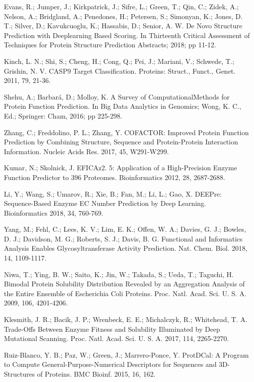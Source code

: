 \documentclass[12pt]{article}
\begin{document}
\begin{thebibliography}{99}
 Evans, R.; Jumper, J.; Kirkpatrick, J.; Sifre, L.; Green, T.; Qin, C.; Zidek, A.; Nelson, A.; Bridgland, A.; Penedones, H.; Petersen, S.; Simonyan, K.; Jones, D. T.; Silver, D.; Kavukcuoglu, K.; Hassabis, D.; Senior, A. W. De Novo Structure Prediction with Deeplearning Based Scoring. In Thirteenth Critical Assessment of Techniques for Protein Structure Prediction Abstracts; 2018; pp 11-12.

 Kinch, L. N.; Shi, S.; Cheng, H.; Cong, Q.; Pei, J.; Mariani, V.; Schwede, T.; Grishin, N. V. CASP9 Target Classification. Proteins: Struct., Funct., Genet. 2011, 79, 21-36.

 Shehu, A.; Barbará, D.; Molloy, K. A Survey of ComputationalMethods for Protein Function Prediction. In Big Data Analytics in Genomics; Wong, K. C., Ed.; Springer: Cham, 2016; pp 225-298.

 Zhang, C.; Freddolino, P. L.; Zhang, Y. COFACTOR: Improved Protein Function Prediction by Combining Structure, Sequence and Protein-Protein Interaction Information. Nucleic Acids Res. 2017, 45, W291-W299.

 Kumar, N.; Skolnick, J. EFICAz2. 5: Application of a High-Precision Enzyme Function Predictor to 396 Proteomes. Bioinformatics 2012, 28, 2687-2688.

 Li, Y.; Wang, S.; Umarov, R.; Xie, B.; Fan, M.; Li, L.; Gao, X. DEEPre: Sequence-Based Enzyme EC Number Prediction by Deep Learning. Bioinformatics 2018, 34, 760-769.

 Yang, M.; Fehl, C.; Lees, K. V.; Lim, E. K.; Offen, W. A.; Davies, G. J.; Bowles, D. J.; Davidson, M. G.; Roberts, S. J.; Davis, B. G. Functional and Informatics Analysis Enables Glycosyltransferase Activity Prediction. Nat. Chem. Biol. 2018, 14, 1109-1117.

 Niwa, T.; Ying, B. W.; Saito, K.; Jin, W.; Takada, S.; Ueda, T.; Taguchi, H. Bimodal Protein Solubility Distribution Revealed by an Aggregation Analysis of the Entire Ensemble of Escherichia Coli Proteins. Proc. Natl. Acad. Sci. U. S. A. 2009, 106, 4201-4206.

 Klesmith, J. R.; Bacik, J. P.; Wrenbeck, E. E.; Michalczyk, R.; Whitehead, T. A. Trade-Offs Between Enzyme Fitness and Solubility Illuminated by Deep Mutational Scanning. Proc. Natl. Acad. Sci. U. S. A. 2017, 114, 2265-2270.

 Ruiz-Blanco, Y. B.; Paz, W.; Green, J.; Marrero-Ponce, Y. ProtDCal: A Program to Compute General-Purpose-Numerical Descriptors for Sequences and 3D-Structures of Proteins. BMC Bioinf. 2015, 16, 162.


\end{thebibliography}
\end{document}
